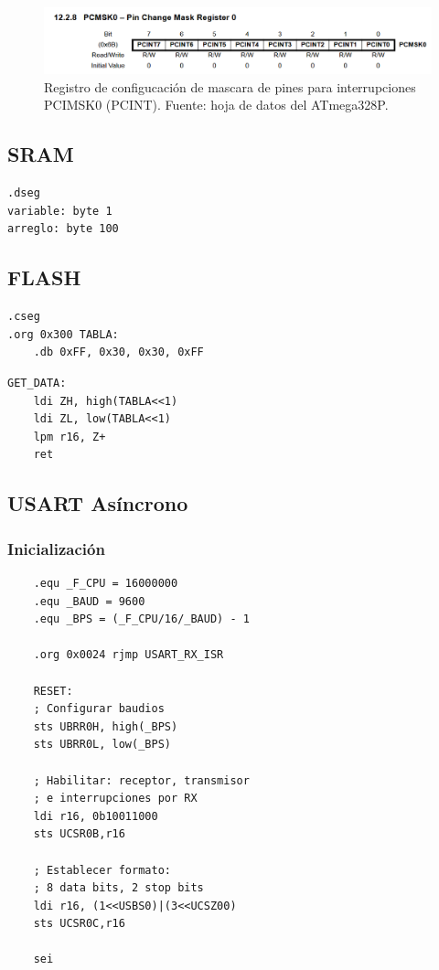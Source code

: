     \begin{figure}[H]
    \centering
    \includegraphics[width=\linewidth]{./Anexos/Marco Teorico/External Interrupts/PCMSK.png}
    \caption{Registro de configucación de mascara de pines para interrupciones PCIMSK0 (PCINT). Fuente: hoja de datos del ATmega328P\@\cite{atmega328p_datasheet}.}
    \label{fig:PCIMSK}
    \end{figure}

\subsection{SRAM}

\begin{verbatim}
.dseg
variable: byte 1  
arreglo: byte 100
\end{verbatim}


\subsection{FLASH}

\begin{verbatim}
.cseg
.org 0x300 TABLA:
    .db 0xFF, 0x30, 0x30, 0xFF
\end{verbatim}

\begin{verbatim}
GET_DATA:
    ldi ZH, high(TABLA<<1)
    ldi ZL, low(TABLA<<1)
    lpm r16, Z+
    ret
\end{verbatim}


\subsection{USART Asíncrono}
    \subsubsection{Inicialización}
    \begin{verbatim}
    .equ _F_CPU = 16000000
    .equ _BAUD = 9600
    .equ _BPS = (_F_CPU/16/_BAUD) - 1

    .org 0x0024 rjmp USART_RX_ISR
    
    RESET:
    ; Configurar baudios
    sts UBRR0H, high(_BPS)
    sts UBRR0L, low(_BPS)

    ; Habilitar: receptor, transmisor
    ; e interrupciones por RX
    ldi r16, 0b10011000
    sts UCSR0B,r16

    ; Establecer formato:
    ; 8 data bits, 2 stop bits
    ldi r16, (1<<USBS0)|(3<<UCSZ00)
    sts UCSR0C,r16

    sei
    \end{verbatim}
